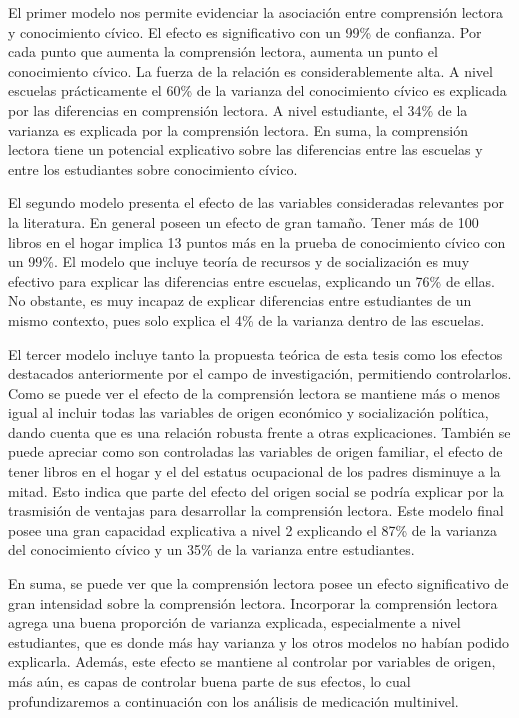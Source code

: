 \documentclass[12pt,twoside]{templates/facsothesis}
\begin{document}
El primer modelo nos permite evidenciar la asociación entre comprensión lectora y conocimiento cívico. El efecto es significativo con un 99\% de confianza. Por cada punto que aumenta la comprensión lectora, aumenta un punto el conocimiento cívico. La fuerza de la relación es considerablemente alta. A nivel escuelas prácticamente el 60\% de la varianza del conocimiento cívico es explicada por las diferencias en comprensión lectora. A nivel estudiante, el 34\% de la varianza es explicada por la comprensión lectora. En suma, la comprensión lectora tiene un potencial explicativo sobre las diferencias entre las escuelas y entre los estudiantes sobre conocimiento cívico.

El segundo modelo presenta el efecto de las variables consideradas relevantes por la literatura. En general poseen un efecto de gran tamaño. Tener más de 100 libros en el hogar implica 13 puntos más en la prueba de conocimiento cívico con un 99\%. El modelo que incluye teoría de recursos y de socialización es muy efectivo para explicar las diferencias entre escuelas, explicando un 76\% de ellas. No obstante, es muy incapaz de explicar diferencias entre estudiantes de un mismo contexto, pues solo explica el 4\% de la varianza dentro de las escuelas.

El tercer modelo incluye tanto la propuesta teórica de esta tesis como los efectos destacados anteriormente por el campo de investigación, permitiendo controlarlos. Como se puede ver el efecto de la comprensión lectora se mantiene más o menos igual al incluir todas las variables de origen económico y socialización política, dando cuenta que es una relación robusta frente a otras explicaciones. También se puede apreciar como son controladas las variables de origen familiar, el efecto de tener libros en el hogar y el del estatus ocupacional de los padres disminuye a la mitad. Esto indica que parte del efecto del origen social se podría explicar por la trasmisión de ventajas para desarrollar la comprensión lectora. Este modelo final posee una gran capacidad explicativa a nivel 2 explicando el 87\% de la varianza del conocimiento cívico y un 35\% de la varianza entre estudiantes.

En suma, se puede ver que la comprensión lectora posee un efecto significativo de gran intensidad sobre la comprensión lectora. Incorporar la comprensión lectora agrega una buena proporción de varianza explicada, especialmente a nivel estudiantes, que es donde más hay varianza y los otros modelos no habían podido explicarla. Además, este efecto se mantiene al controlar por variables de origen, más aún, es capas de controlar buena parte de sus efectos, lo cual profundizaremos a continuación con los análisis de medicación multinivel.
\end{document}
